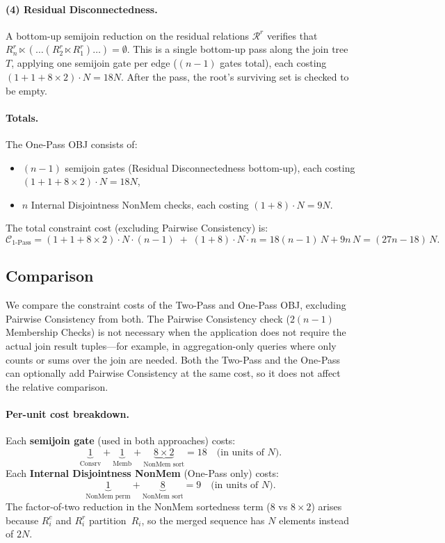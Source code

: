\documentclass[sigconf]{acmart}
\begin{document}
\paragraph{(4) Residual Disconnectedness.}
A bottom-up semijoin reduction on the residual relations $\mathcal{R}^r$ verifies that $R_n^r \ltimes (\dots (R_2^r \ltimes R_1^r)\dots) = \emptyset$.
This is a single bottom-up pass along the join tree $T$, applying one semijoin gate per edge ($(n{-}1)$ gates total), each costing $(1+1+8 \times 2) \cdot N = 18N$.
After the pass, the root's surviving set is checked to be empty.

\paragraph{Totals.}
The One-Pass OBJ consists of:
\begin{itemize}
    \item $(n{-}1)$ semijoin gates (Residual Disconnectedness bottom-up), each costing $(1+1+8 \times 2) \cdot N = 18N$,
    \item $n$ Internal Disjointness NonMem checks, each costing $(1+8) \cdot N = 9N$.
\end{itemize}
The total constraint cost (excluding Pairwise Consistency) is:
\[
\mathcal{C}_{\text{1-Pass}}
= (1{+}1{+}8 \times 2) \cdot N \cdot (n{-}1) \;+\; (1{+}8) \cdot N \cdot n
= 18(n{-}1)\,N + 9n\,N
= (27n{-}18)\,N.
\]

\subsection{Comparison}

We compare the constraint costs of the Two-Pass and One-Pass OBJ, excluding Pairwise Consistency from both.
The Pairwise Consistency check ($2(n{-}1)$ Membership Checks) is not necessary when the application does not require the actual join result tuples---for example, in aggregation-only queries where only counts or sums over the join are needed.
Both the Two-Pass and the One-Pass can optionally add Pairwise Consistency at the same cost, so it does not affect the relative comparison.

\paragraph{Per-unit cost breakdown.}
Each \textbf{semijoin gate} (used in both approaches) costs:
\[
\underbrace{1}_{\text{Consrv}} + \underbrace{1}_{\text{Memb}} + \underbrace{8 \times 2}_{\text{NonMem sort}} = 18 \quad \text{(in units of $N$)}.
\]
Each \textbf{Internal Disjointness NonMem} (One-Pass only) costs:
\[
\underbrace{1}_{\text{NonMem perm}} + \underbrace{8}_{\text{NonMem sort}} = 9 \quad \text{(in units of $N$)}.
\]
The factor-of-two reduction in the NonMem sortedness term ($8$ vs $8 \times 2$) arises because $R_i^c$ and $R_i^r$ partition~$R_i$, so the merged sequence has $N$ elements instead of $2N$.
\end{document}
